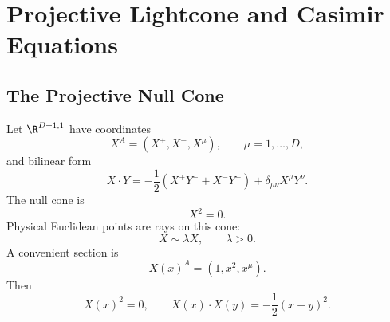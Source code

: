 \chapter{Projective Lightcone and Casimir Equations}
\label{ch:volume-iii-projective-lightcone-casimir}

\section{The Projective Null Cone}

Let \(\R^{D+1,1}\) have coordinates
\[
  X^A=(X^+,X^-,X^\mu),
  \qquad
  \mu=1,\ldots,D,
\]
and bilinear form
\begin{equation}
  X\cdot Y
  =
  -\frac12(X^+Y^-+X^-Y^+)
  +
  \delta_{\mu\nu}X^\mu Y^\nu.
  \label{eq:embedding-bilinear-form}
\end{equation}
The null cone is
\[
  X^2=0.
\]
Physical Euclidean points are rays on this cone:
\[
  X\sim \lambda X,
  \qquad
  \lambda>0.
\]
A convenient section is
\begin{equation}
  X(x)^A=(1,x^2,x^\mu).
  \label{eq:embedding-section}
\end{equation}
Then
\[
  X(x)^2=0,
  \qquad
  X(x)\cdot X(y)=-\frac12(x-y)^2.
  \label{eq:embedding-distance}
\]

